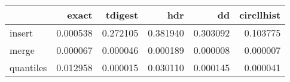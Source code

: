 \begin{tabular}{lrrrrr}
\toprule
{} &     exact &   tdigest &       hdr &        dd &  circllhist \\
\midrule
insert    &  0.000538 &  0.272105 &  0.381940 &  0.303092 &    0.103775 \\
merge     &  0.000067 &  0.000046 &  0.000189 &  0.000008 &    0.000007 \\
quantiles &  0.012958 &  0.000015 &  0.030110 &  0.000145 &    0.000041 \\
\bottomrule
\end{tabular}
